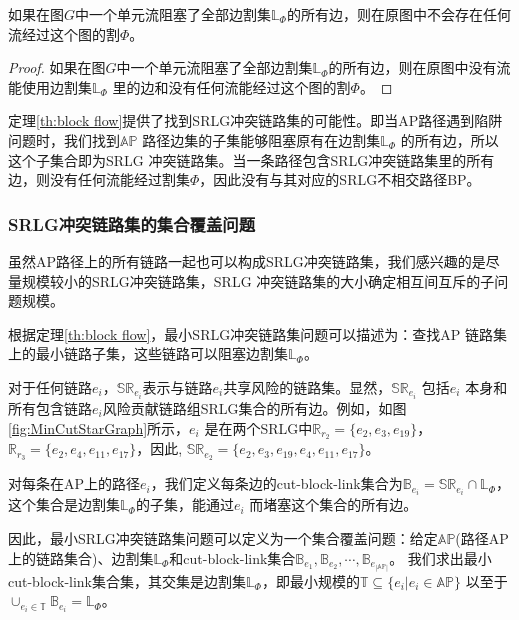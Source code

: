 \begin{theorem}
    如果在图$G$中一个单元流阻塞了全部边割集$\mathbb{L}_{\Phi}$的所有边，则在原图中不会存在任何流经过这个图的割$\Phi$。
\label{th:block flow}
\end{theorem}


\begin{proof}
    如果在图$G$中一个单元流阻塞了全部边割集$\mathbb{L}_{\Phi}$的所有边，则在原图中没有流能使用边割集$\mathbb{L}_{\Phi}$ 里的边和没有任何流能经过这个图的割$\Phi$。
\end{proof}
定理\ref{th:block flow}提供了找到SRLG冲突链路集的可能性。即当AP路径遇到陷阱问题时，我们找到$\mathbb{AP}$ 路径边集的子集能够阻塞原有在边割集$\mathbb{L}_{\Phi}$ 的所有边，所以这个子集合即为SRLG 冲突链路集。当一条路径包含SRLG冲突链路集里的所有边，则没有任何流能经过割集$\Phi$，因此没有与其对应的SRLG不相交路径BP。

\subsubsection{SRLG冲突链路集的集合覆盖问题}
\label{subsec:Set cover problem for SRLG Conflicting Link Set}
虽然AP路径上的所有链路一起也可以构成SRLG冲突链路集，我们感兴趣的是尽量规模较小的SRLG冲突链路集，SRLG 冲突链路集的大小确定相互间互斥的子问题规模。

根据定理\ref{th:block flow}，最小SRLG冲突链路集问题可以描述为：查找AP 链路集上的最小链路子集，这些链路可以阻塞边割集$\mathbb{L}_{\Phi}$。

对于任何链路$e_i$，$\mathbb{SR}_{e_i}$表示与链路$e_i$共享风险的链路集。显然，$\mathbb{SR}_{e_i}$ 包括$e_i$ 本身和所有包含链路$e_i$风险贡献链路组SRLG集合的所有边。例如，如图\ref{fig:MinCutStarGraph}所示，$e_i$ 是在两个SRLG中$\mathbb{R}_{r_2}=\{e_2,e_3,e_{19}\}$， $\mathbb{R}_{r_3}=\{e_2,e_4,e_{11},e_{17}\}$，因此, $\mathbb{SR}_{e_2}=\{e_2,e_3,e_{19},e_4,e_{11},e_{17}\}$。

对每条在AP上的路径$e_i$，我们定义每条边的cut-block-link集合为${\mathbb{B}_{{e_i}}} = \mathbb{SR}_{{e_i}} \cap \mathbb{L}_{\Phi}$，这个集合是边割集$\mathbb{L}_{\Phi}$的子集，能通过$e_i$ 而堵塞这个集合的所有边。

因此，最小SRLG冲突链路集问题可以定义为一个集合覆盖问题：给定$\mathbb{AP}$(路径AP 上的链路集合)、边割集$\mathbb{L}_{\Phi}$和cut-block-link集合${\mathbb{B}_{{e_1}}},{\mathbb{B}_{{e_2}}}, \cdots ,{\mathbb{B}_{{e_{|\mathbb{AP}|}}}}$。 我们求出最小cut-block-link集合集，其交集是边割集$\mathbb{L}_{\Phi}$，即最小规模的$\mathbb{T} \subseteq \{e_i| e_i\in \mathbb{AP}\}$ 以至于 ${ \cup_{e_i \in \mathbb{T}}}{\mathbb{B}_{e_i}} = \mathbb{L}_{\Phi}$。


